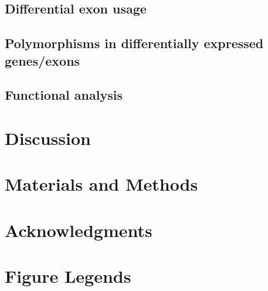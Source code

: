 \documentclass[10pt]{article}
\begin{document}
\subsection*{Differential exon usage}

\subsection*{Polymorphisms in differentially expressed genes/exons}

\subsection*{Functional analysis}


\section*{Discussion}

\section*{Materials and Methods}

\section*{Acknowledgments}




\section*{Figure Legends}
\end{document}

